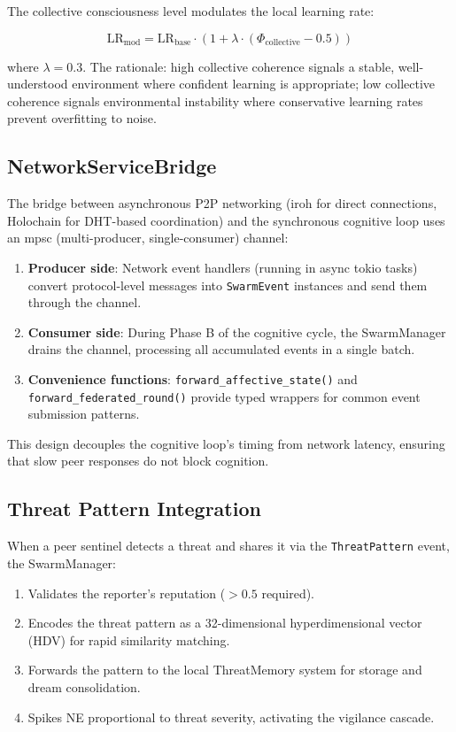 \documentclass[11pt,a4paper]{article}
\begin{document}
The collective consciousness level modulates the local learning rate:

\begin{equation}
\text{LR}_{\text{mod}} = \text{LR}_{\text{base}} \cdot (1 + \lambda \cdot (\Phi_{\text{collective}} - 0.5))
\end{equation}

\noindent where $\lambda = 0.3$. The rationale: high collective coherence signals a stable, well-understood environment where confident learning is appropriate; low collective coherence signals environmental instability where conservative learning rates prevent overfitting to noise.

\subsection{NetworkServiceBridge}

The bridge between asynchronous P2P networking (iroh for direct connections, Holochain for DHT-based coordination) and the synchronous cognitive loop uses an mpsc (multi-producer, single-consumer) channel:

\begin{enumerate}
  \item \textbf{Producer side}: Network event handlers (running in async tokio tasks) convert protocol-level messages into \texttt{SwarmEvent} instances and send them through the channel.
  \item \textbf{Consumer side}: During Phase B of the cognitive cycle, the SwarmManager drains the channel, processing all accumulated events in a single batch.
  \item \textbf{Convenience functions}: \texttt{forward\_affective\_state()} and \texttt{forward\_federated\_round()} provide typed wrappers for common event submission patterns.
\end{enumerate}

This design decouples the cognitive loop's timing from network latency, ensuring that slow peer responses do not block cognition.

\subsection{Threat Pattern Integration}

When a peer sentinel detects a threat and shares it via the \texttt{ThreatPattern} event, the SwarmManager:

\begin{enumerate}
  \item Validates the reporter's reputation ($> 0.5$ required).
  \item Encodes the threat pattern as a 32-dimensional hyperdimensional vector (HDV) for rapid similarity matching.
  \item Forwards the pattern to the local ThreatMemory system for storage and dream consolidation.
  \item Spikes NE proportional to threat severity, activating the vigilance cascade.
\end{enumerate}
\end{document}
